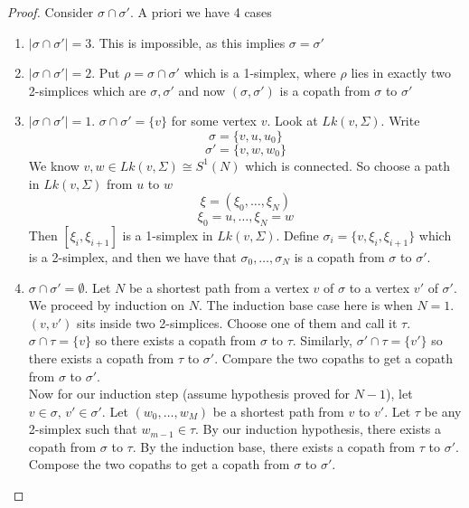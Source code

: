 \documentclass[a4paper,14pt]{extarticle}
\theoremstyle{definition}
\begin{document}
\begin{proof}
	Consider $\sigma\cap\sigma'$. A priori we have 4 cases
	\begin{enumerate}
		\item $|\sigma\cap\sigma'|=3$. This is impossible, as this implies $\sigma=\sigma'$
		\item $|\sigma\cap\sigma'|=2$. Put $\rho=\sigma\cap\sigma'$ which is a 1-simplex, where
					$\rho$ lies in exactly two 2-simplices which are $\sigma,\sigma'$ and now 
					$(\sigma,\sigma')$ is a copath from $\sigma$ to $\sigma'$
		\item $|\sigma\cap\sigma'|=1$. $\sigma\cap\sigma'=\{v\}$ for some vertex $v$. Look at 
					$Lk(v,\Sigma)$. Write \[\sigma=\{v,u,u_0\}\]\[\sigma'=\{v,w,w_0\}\] We know 
				$v,w\in Lk(v,\Sigma)\cong S^1(N)$ which is connected. So choose a path in 
				$Lk(v,\Sigma)$ from $u$ to $w$ \[\xi=(\xi_0,\ldots,\xi_N)\]\[\xi_0=u,\ldots,\xi_N=w\]
				Then $[\xi_i,\xi_{i+1}]$ is a 1-simplex in $Lk(v,\Sigma)$. Define 
				$\sigma_i=\{v,\xi_i,\xi_{i+1}\}$ which is a 2-simplex, and then we have 
				that $\sigma_0,\ldots,\sigma_N$ is a copath from $\sigma$ to $\sigma'$.
		\item $\sigma\cap\sigma'=\emptyset$. Let $N$ be a shortest path from a vertex $v$ of 
				$\sigma$ to a vertex $v'$ of $\sigma'$. We proceed by induction on $N$. The induction
				base case here is when $N=1$. $(v,v')$ sits inside two 2-simplices. Choose one of 
				them and call it $\tau$. $\sigma\cap\tau=\{v\}$ so there exists a copath from 
				$\sigma$ to $\tau$. Similarly, $\sigma'\cap\tau=\{v'\}$ so there exists a copath 
				from $\tau$ to $\sigma'$. Compare the two copaths to get a copath from $\sigma$ 
				to $\sigma'$. \\

				Now for our induction step (assume hypothesis proved for $N-1$), let 
				$v\in\sigma, \,v'\in\sigma'$. Let $(w_0,\ldots,w_M)$ be a shortest path from 
				$v$ to $v'$. Let $\tau$ be any 2-simplex such that $w_{m-1}\in\tau$. By 
				our induction hypothesis, there exists a copath from $\sigma$ to $\tau$. By 
				the induction base, there exists a copath from $\tau$ to $\sigma'$. Compose the 
				two copaths to get a copath from $\sigma$ to $\sigma'$.
	\end{enumerate}
\end{proof}
\end{document}

